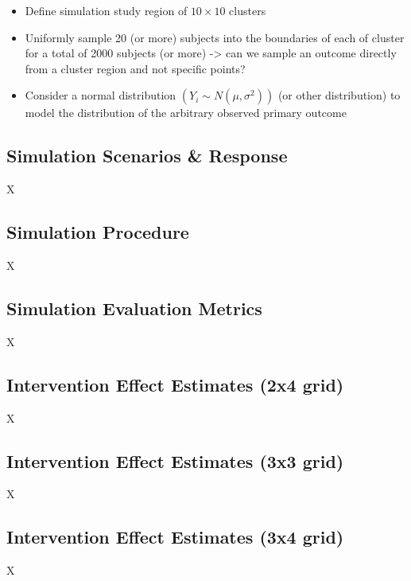 \documentclass{article}[11pt]
\begin{document}
\begin{itemize}
    \item Define simulation study region of $10 \times 10$ clusters

    \item Uniformly sample 20 (or more) subjects into the boundaries of each of cluster for a total of 2000 subjects (or more) -> can we sample an outcome directly from a cluster region and not specific points?

    \item Consider a normal distribution $\left(Y_i \sim N\left(\mu, \sigma^2\right)\right)$ (or other distribution) to model the distribution of the arbitrary observed primary outcome
\end{itemize} 

\subsection{Simulation Scenarios \& Response}

X

\subsection{Simulation Procedure}

X

\subsection{Simulation Evaluation Metrics}

X

\subsection{Intervention Effect Estimates (2x4 grid)}

X

\subsection{Intervention Effect Estimates (3x3 grid)}

X

\subsection{Intervention Effect Estimates (3x4 grid)}

X

\end{document}
